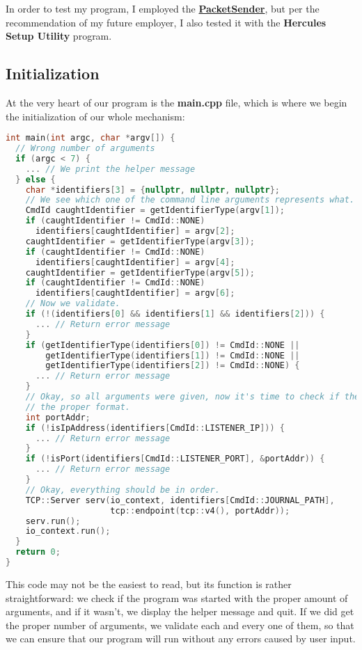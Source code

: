\documentclass[openany,10pt,a4paper]{book}
\begin{document}
In order to test my program, I employed the \href{https://packetsender.com/}{\textbf{PacketSender}}, but per the recommendation of my future employer, I also tested it with the \textbf{Hercules Setup Utility} program.
\subsection{Initialization}

At the very heart of our program is the \textbf{main.cpp} file, which is where we begin the initialization of our whole mechanism:

\begin{lstlisting}[language=C++,caption=main.cpp distilled]
int main(int argc, char *argv[]) {
  // Wrong number of arguments
  if (argc < 7) {
    ... // We print the helper message
  } else {
    char *identifiers[3] = {nullptr, nullptr, nullptr};
    // We see which one of the command line arguments represents what.
    CmdId caughtIdentifier = getIdentifierType(argv[1]);
    if (caughtIdentifier != CmdId::NONE)
      identifiers[caughtIdentifier] = argv[2];
    caughtIdentifier = getIdentifierType(argv[3]);
    if (caughtIdentifier != CmdId::NONE)
      identifiers[caughtIdentifier] = argv[4];
    caughtIdentifier = getIdentifierType(argv[5]);
    if (caughtIdentifier != CmdId::NONE)
      identifiers[caughtIdentifier] = argv[6];
    // Now we validate.
    if (!(identifiers[0] && identifiers[1] && identifiers[2])) {
      ... // Return error message
    }
    if (getIdentifierType(identifiers[0]) != CmdId::NONE ||
        getIdentifierType(identifiers[1]) != CmdId::NONE ||
        getIdentifierType(identifiers[2]) != CmdId::NONE) {
      ... // Return error message
    }
    // Okay, so all arguments were given, now it's time to check if they are in
    // the proper format.
    int portAddr;
    if (!isIpAddress(identifiers[CmdId::LISTENER_IP])) {
      ... // Return error message
    }
    if (!isPort(identifiers[CmdId::LISTENER_PORT], &portAddr)) {
      ... // Return error message
    }
    // Okay, everything should be in order.
    TCP::Server serv(io_context, identifiers[CmdId::JOURNAL_PATH],
                     tcp::endpoint(tcp::v4(), portAddr));
    serv.run();
    io_context.run();
  }
  return 0;
}
\end{lstlisting}

This code may not be the easiest to read, but its function is rather straightforward: we check if the program was started with the proper amount of arguments, and if it wasn't, we display the helper message and quit. If we did get the proper number of arguments, we validate each and every one of them, so that we can ensure that our program will run without any errors caused by user input.
\end{document}
